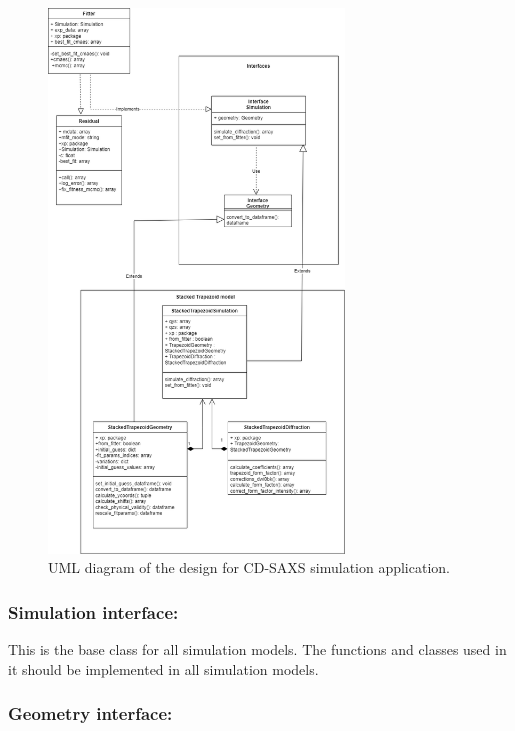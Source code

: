 \medskip

\begin{figure}[h]
    \centering
    \includegraphics[width=0.7\textwidth]{images/cdsaxs_UML.png}
    \caption{UML diagram of the design for CD-SAXS simulation application. }
    \label{fig:UML}
\end{figure}

\FloatBarrier

\subsubsection*{\textbf{Simulation interface:}}

This is the base class for all simulation models. The functions and classes used in it should be implemented
in all simulation models.

\subsubsection*{\textbf{Geometry interface:}}

